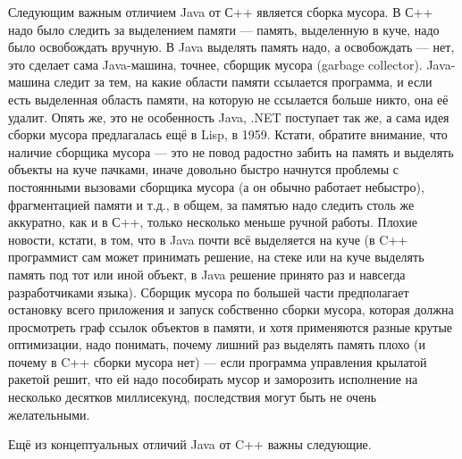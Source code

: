 \documentclass[a5paper]{article}
\begin{document}
Следующим важным отличием Java от С++ является сборка мусора. В С++ надо было следить за выделением памяти --- память, выделенную в куче, надо было освобождать вручную. В Java выделять память надо, а освобождать --- нет, это сделает сама Java-машина, точнее, сборщик мусора (garbage collector). Java-машина следит за тем, на какие области памяти ссылается программа, и если есть выделенная область памяти, на которую не ссылается больше никто, она её удалит. Опять же, это не особенность Java, .NET поступает так же, а сама идея сборки мусора предлагалась ещё в Lisp, в 1959. Кстати, обратите внимание, что наличие сборщика мусора --- это не повод радостно забить на память и выделять объекты на куче пачками, иначе довольно быстро начнутся проблемы с постоянными вызовами сборщика мусора (а он обычно работает небыстро), фрагментацией памяти и т.д., в общем, за памятью надо следить столь же аккуратно, как и в С++, только несколько меньше ручной работы. Плохие новости, кстати, в том, что в Java почти всё выделяется на куче (в C++ программист сам может принимать решение, на стеке или на куче выделять память под тот или иной объект, в Java решение принято раз и навсегда разработчиками языка). Сборщик мусора по большей части предполагает остановку всего приложения и запуск собственно сборки мусора, которая должна просмотреть граф ссылок объектов в памяти, и хотя применяются разные крутые оптимизации, надо понимать, почему лишний раз выделять память плохо (и почему в C++ сборки мусора нет) --- если программа управления крылатой ракетой решит, что ей надо пособирать мусор и заморозить исполнение на несколько десятков миллисекунд, последствия могут быть не очень желательными.

Ещё из концептуальных отличий Java от C++ важны следующие.
\end{document}

